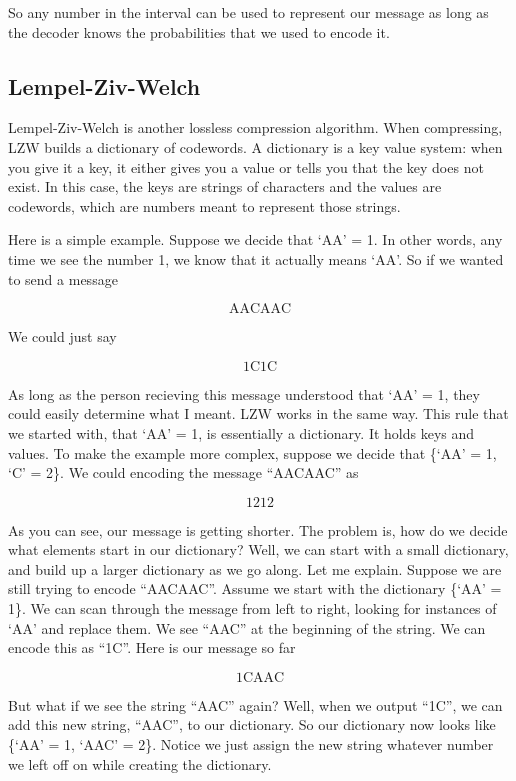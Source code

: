 \documentclass[12pt,twoside]{reedthesis}
\begin{document}
So any number in the interval can be used to represent our message as long as the decoder knows the probabilities that we used to encode it.

\hypertarget{lempel-ziv-welch}{%
\subsection{Lempel-Ziv-Welch}\label{lempel-ziv-welch}}

Lempel-Ziv-Welch is another lossless compression algorithm. When compressing, LZW builds a dictionary of codewords. A dictionary is a key value system: when you give it a key, it either gives you a value or tells you that the key does not exist. In this case, the keys are strings of characters and the values are codewords, which are numbers meant to represent those strings.

Here is a simple example. Suppose we decide that `AA' = 1. In other words, any time we see the number 1, we know that it actually means `AA'. So if we wanted to send a message

\[\text{AACAAC}\]

We could just say

\[\text{1C1C}\]

As long as the person recieving this message understood that `AA' = 1, they could easily determine what I meant. LZW works in the same way. This rule that we started with, that `AA' = 1, is essentially a dictionary. It holds keys and values. To make the example more complex, suppose we decide that \{`AA' = 1, `C' = 2\}. We could encoding the message ``AACAAC'' as

\[\text{1212}\]

As you can see, our message is getting shorter. The problem is, how do we decide what elements start in our dictionary? Well, we can start with a small dictionary, and build up a larger dictionary as we go along. Let me explain. Suppose we are still trying to encode ``AACAAC''. Assume we start with the dictionary \{`AA' = 1\}. We can scan through the message from left to right, looking for instances of `AA' and replace them. We see ``AAC'' at the beginning of the string. We can encode this as ``1C''. Here is our message so far

\[\text{1CAAC}\]

But what if we see the string ``AAC'' again? Well, when we output ``1C'', we can add this new string, ``AAC'', to our dictionary. So our dictionary now looks like \{`AA' = 1, `AAC' = 2\}. Notice we just assign the new string whatever number we left off on while creating the dictionary.
\end{document}
